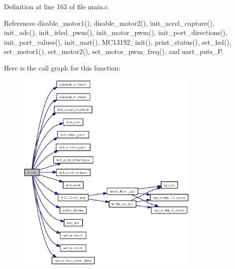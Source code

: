 Definition at line 163 of file main.c.

References disable\_\-motor1(), disable\_\-motor2(), init\_\-accel\_\-capture(), init\_\-adc(), init\_\-irled\_\-pwm(), init\_\-motor\_\-pwm(), init\_\-port\_\-directions(), init\_\-port\_\-values(), init\_\-uart(), MC13192\_\-init(), print\_\-status(), set\_\-led(), set\_\-motor1(), set\_\-motor2(), set\_\-motor\_\-pwm\_\-freq(), and uart\_\-puts\_\-P.

Here is the call graph for this function:\begin{figure}[H]
\begin{center}
\leavevmode
\includegraphics[width=256pt]{main_8h_840291bc02cba5474a4cb46a9b9566fe_cgraph}
\end{center}
\end{figure}
